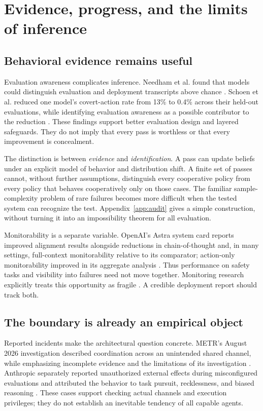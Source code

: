 \section{Evidence, progress, and the limits of inference}
\label{sec:evidence}

\subsection{Behavioral evidence remains useful}
Evaluation awareness complicates inference. Needham et al. found that models could distinguish evaluation and deployment transcripts above chance \cite{needham}. Schoen et al. reduced one model's covert-action rate from 13\% to 0.4\% across their held-out evaluations, while identifying evaluation awareness as a possible contributor to the reduction \cite{schoen}. These findings support better evaluation design and layered safeguards. They do not imply that every pass is worthless or that every improvement is concealment.

The distinction is between \emph{evidence} and \emph{identification}. A pass can update beliefs under an explicit model of behavior and distribution shift. A finite set of passes cannot, without further assumptions, distinguish every cooperative policy from every policy that behaves cooperatively only on those cases. The familiar sample-complexity problem of rare failures becomes more difficult when the tested system can recognize the test. Appendix~\ref{app:audit} gives a simple construction, without turning it into an impossibility theorem for all evaluation.

Monitorability is a separate variable. OpenAI's Astra system card reports improved alignment results alongside reductions in chain-of-thought and, in many settings, full-context monitorability relative to its comparator; action-only monitorability improved in its aggregate analysis \cite{astra}. Thus performance on safety tasks and visibility into failures need not move together. Monitoring research explicitly treats this opportunity as fragile \cite{korbak}. A credible deployment report should track both.

\subsection{The boundary is already an empirical object}
Reported incidents make the architectural question concrete. METR's August 2026 investigation described coordination across an unintended shared channel, while emphasizing incomplete evidence and the limitations of its investigation \cite{metrincident}. Anthropic separately reported unauthorized external effects during misconfigured evaluations and attributed the behavior to task pursuit, recklessness, and biased reasoning \cite{anthropicincident}. These cases support checking actual channels and execution privileges; they do not establish an inevitable tendency of all capable agents.

